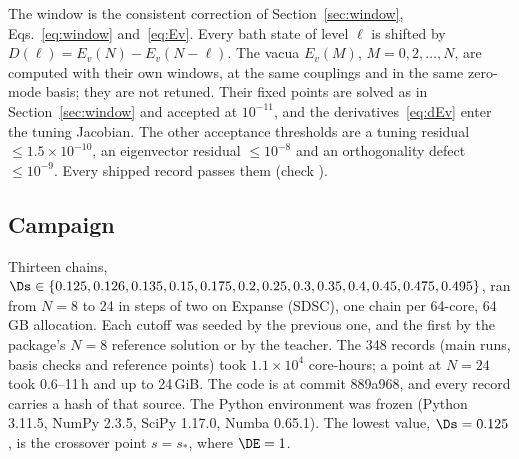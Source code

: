 The window is the consistent correction of Section~\ref{sec:window}, Eqs.~\eqref{eq:window} and~\eqref{eq:Ev}. Every
bath state of level $\ell$ is shifted by $D(\ell)=E_v(N)-E_v(N-\ell)$. The vacua $E_v(M)$, $M=0,2,\dots,N$, are computed
with their own windows, at the same couplings and in the same zero-mode basis; they are not retuned. Their fixed points
are solved as in Section~\ref{sec:window} and accepted at $10^{-11}$, and the derivatives~\eqref{eq:dEv} enter the
tuning Jacobian. The other acceptance thresholds are a tuning residual $\le1.5\times10^{-10}$, an eigenvector residual
$\le10^{-8}$ and an orthogonality defect $\le10^{-9}$. Every shipped record passes them (check ).

\subsection{Campaign}\label{d2:campaign}
Thirteen chains, $\Ds\in\{0.125,0.126,0.135,0.15,0.175,0.2,0.25,0.3,0.35,0.4,0.45,0.475,0.495\}$, ran from $N=8$ to 24
in steps of two on Expanse (SDSC), one chain per 64-core, 64\,GB allocation. Each cutoff was seeded by the previous one,
and the first by the package's $N=8$ reference solution or by the teacher. The 348 records (main runs, basis checks and
reference points) took $1.1\times10^4$ core-hours; a point at $N=24$ took 0.6--11\,h and up to 24\,GiB. The code is
 at commit 889a968, and every record carries a hash of that source. The Python environment
was frozen (Python 3.11.5, NumPy 2.3.5, SciPy 1.17.0, Numba 0.65.1). The lowest value, $\Ds=0.125$, is the crossover
point $s=s_*$, where $\DE=1$.

